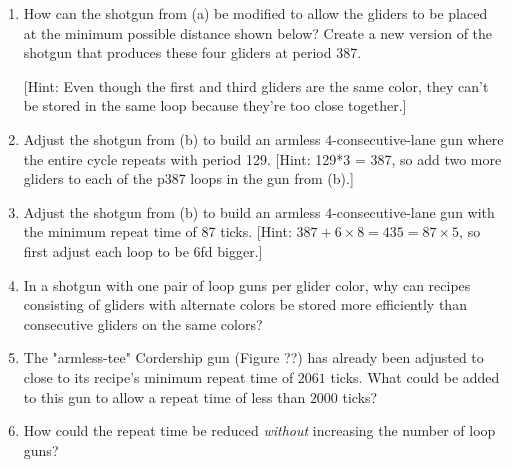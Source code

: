 \begin{multicols}{2}
\begin{problem}
\begin{enumerate}[label=\bf\color{ocre}(\alph*)]
            to build an armless $4$-consecutive-lane shotgun like the one from Figure~\ref{fig:armless_4_lane_gun}, but with period 387.
        \item How can the shotgun from (a) be modified to allow the gliders to be placed at the minimum possible distance shown below? Create a new version of the shotgun that produces these four gliders at period 387.
        
        \begin{center}
        \end{center}
    
[Hint: Even though the first and third gliders are the same color, they can't be stored in the same loop because they're too close together.]
		\item Adjust the shotgun from (b) to build an armless $4$-consecutive-lane gun where the entire cycle repeats with period 129.  [Hint: 129*3 = 387, so add two more gliders to each of the p387 loops in the gun from (b).]
		\item Adjust the shotgun from (b) to build an armless $4$-consecutive-lane gun with the minimum repeat time of 87 ticks.  [Hint: $387+6 \times 8 = 435 = 87\times5$, so first adjust each loop to be 6fd bigger.]
		\item In a shotgun with one pair of loop guns per glider color, why can recipes consisting of gliders with alternate colors be stored more efficiently than consecutive gliders on the same colors?
		\item The "armless-tee" Cordership gun (Figure ??) has already been adjusted to close to its recipe's minimum repeat time of $2061$ ticks. What could be added to this gun to allow a repeat time of less than $2000$ ticks?
		\item How could the repeat time be reduced \emph{without} increasing the number of loop guns?

\end{enumerate}
\end{problem}
\end{multicols}
